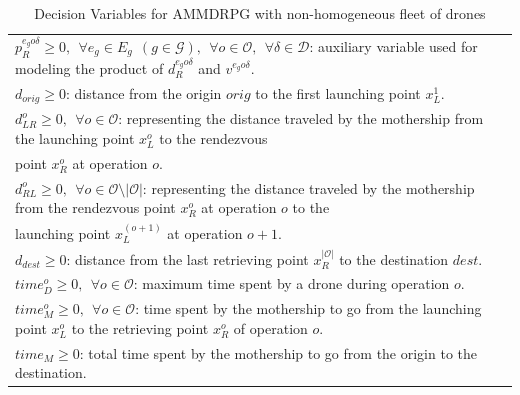 \documentclass[10pt,a4paper]{elsarticle}
\begin{document}
\begin{table}[h!]
\begin{tabular}{|l|}
		$p_R^{e_go\delta} \geq 0, \:\: \forall e_g \in E_g\:\: (g \in \mathcal{G}), \:\:\forall o \in \mathcal O, \:\:\forall \delta\in\mathcal D$: auxiliary variable used for modeling the product of $d_R^{e_go\delta}$ and $v^{e_go\delta}$.\\
		$d_{orig}\geq 0$: distance from the origin $orig$ to the first launching point $x_L^1$.\\
		$d_{LR}^o \geq 0, \:\: \forall o \in \mathcal O$: representing the distance traveled by the mothership from the launching point $x_L^o$ to the rendezvous\\
		\hspace*{1cm}   point $x_R^o$ at operation $o$.\\
		$d_{RL}^o \geq 0, \:\: \forall o \in \mathcal O\setminus|\mathcal O|$: representing the distance traveled by the mothership from the rendezvous point $x_R^o$ at operation $o$ to the \\ 
		\hspace*{1cm}  launching point $x_L^{(o+1)}$ at operation $o+1$.\\
		$d_{dest}\geq 0$: distance from the last retrieving point $x_R^{|\mathcal O|}$ to the destination $dest$.\\
		$time_D^o \geq 0, \:\: \forall o \in \mathcal O$: maximum time spent by a drone during operation $o$.\\
		$time_M^o \geq 0, \:\: \forall o \in \mathcal O$: time spent by the mothership to go from the launching point $x_L^o$ to the retrieving point $x_R^o$ of operation $o$.\\
		$time_M \geq 0$: total time spent by the mothership to go from the origin to the destination.\\
		\hline
	\end{tabular}
	\caption{Decision Variables for AMMDRPG with non-homogeneous fleet of drones}
	\label{table:At2}
\end{table}
\end{document}
